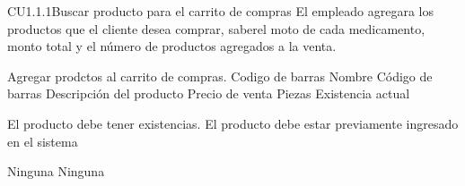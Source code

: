 \begin{UseCase} {CU1.1.1}{Buscar producto para el carrito de compras}{
	El empleado agregara los productos que el cliente desea comprar, saberel moto de cada medicamento, monto total y el número de productos agregados a la venta.
}








	
	{
	}
	{
		Agregar prodctos al carrito de compras.
	}
	{
		\UCli Codigo de barras
		\UCli Nombre
	}
	{
		\UCli Código de barras 
		\UCli Descripción del producto
		\UCli Precio de venta
		\UCli Piezas
		\UCli Existencia actual
	}

	{
		\UCli El producto debe tener existencias. 
		\UCli El producto debe estar previamente ingresado en el sistema


	}
	{
		Ninguna
	}
	{
	}
	{
		Ninguna
	}
\end{UseCase}


